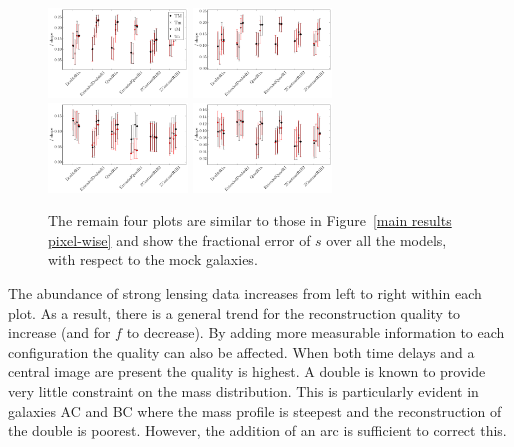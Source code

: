 \documentclass[galley,usenatbib]{mn2e}
\newcommand{\figref}[1] {Figure~\ref{#1}}
\begin{document}
\begin{figure}
  \includegraphics[width=0.33\textwidth]{AAferror_shape-1sig.pdf} \hspace{2cm}
\includegraphics[width=0.33\textwidth]{BBferror_shape-1sig.pdf}\\
\includegraphics[width=0.33\textwidth]{ACferror_shape-1sig.pdf}\hspace{2cm}
\includegraphics[width=0.33\textwidth]{BCferror_shape-1sig.pdf}
\caption{ The remain four plots are similar to those in \figref{main
  results pixel-wise} and show the fractional error of $s$ over all the models,
with respect to the mock galaxies.}

\label{shape results}
\end{figure}

The abundance of strong lensing data increases from left to right within each plot. As
a result, there is a general trend for the reconstruction quality to increase
(and for $f$ to decrease). By adding more measurable information to each
configuration the quality can also be affected. When both time delays and a
central image are present the quality is highest. A double is known to provide
very little constraint on the mass distribution. This is particularly evident in
galaxies AC and BC where the mass profile is steepest and the reconstruction of
the double is poorest. However, the addition of an arc is sufficient to correct
this.
\end{document}

